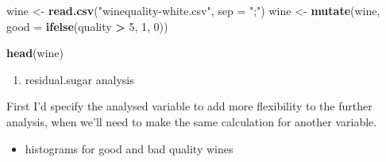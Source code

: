 \documentclass[
]{article}
\newenvironment{Shaded}{\begin{snugshade}}{\end{snugshade}}
\newcommand{\AttributeTok}[1]{\textcolor[rgb]{0.13,0.29,0.53}{#1}}
\newcommand{\DecValTok}[1]{\textcolor[rgb]{0.00,0.00,0.81}{#1}}
\newcommand{\FunctionTok}[1]{\textcolor[rgb]{0.13,0.29,0.53}{\textbf{#1}}}
\newcommand{\NormalTok}[1]{#1}
\newcommand{\OtherTok}[1]{\textcolor[rgb]{0.56,0.35,0.01}{#1}}
\newcommand{\SpecialCharTok}[1]{\textcolor[rgb]{0.81,0.36,0.00}{\textbf{#1}}}
\newcommand{\StringTok}[1]{\textcolor[rgb]{0.31,0.60,0.02}{#1}}
\providecommand{\tightlist}{%
  \setlength{\itemsep}{0pt}\setlength{\parskip}{0pt}}
\begin{document}
\begin{Shaded}
\begin{Highlighting}[]
\NormalTok{wine }\OtherTok{\textless{}{-}} \FunctionTok{read.csv}\NormalTok{(}\StringTok{"winequality{-}white.csv"}\NormalTok{, }\AttributeTok{sep =} \StringTok{";"}\NormalTok{)}
\NormalTok{wine }\OtherTok{\textless{}{-}} \FunctionTok{mutate}\NormalTok{(wine, }\AttributeTok{good =} \FunctionTok{ifelse}\NormalTok{(quality }\SpecialCharTok{\textgreater{}} \DecValTok{5}\NormalTok{, }\DecValTok{1}\NormalTok{, }\DecValTok{0}\NormalTok{))}

\FunctionTok{head}\NormalTok{(wine)}
\end{Highlighting}
\end{Shaded}

\begin{enumerate}
\def\labelenumi{\alph{enumi}.}
\setcounter{enumi}{1}
\tightlist
\item
  residual.sugar analysis
\end{enumerate}

First I'd specify the analysed variable to add more flexibility to the
further analysis, when we'll need to make the same calculation for
another variable.

\begin{Shaded}
\end{Shaded}

\begin{itemize}
\tightlist
\item
  histograms for good and bad quality wines
\end{itemize}
\end{document}
